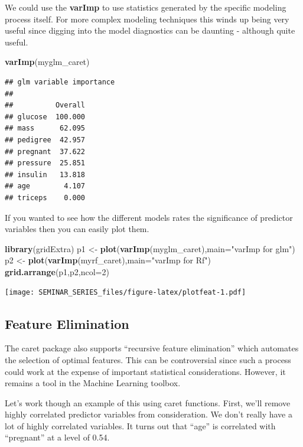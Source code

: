 \documentclass[]{book}
\newenvironment{Shaded}{\begin{snugshade}}{\end{snugshade}}
\newcommand{\KeywordTok}[1]{\textcolor[rgb]{0.13,0.29,0.53}{\textbf{#1}}}
\newcommand{\DataTypeTok}[1]{\textcolor[rgb]{0.13,0.29,0.53}{#1}}
\newcommand{\DecValTok}[1]{\textcolor[rgb]{0.00,0.00,0.81}{#1}}
\newcommand{\StringTok}[1]{\textcolor[rgb]{0.31,0.60,0.02}{#1}}
\newcommand{\NormalTok}[1]{#1}
\begin{document}
We could use the \textbf{varImp} to use statistics generated by the
specific modeling process itself. For more complex modeling techniques
this winds up being very useful since digging into the model diagnostics
can be daunting - although quite useful.

\begin{Shaded}
\begin{Highlighting}[]
\KeywordTok{varImp}\NormalTok{(myglm_caret)}
\end{Highlighting}
\end{Shaded}

\begin{verbatim}
## glm variable importance
## 
##          Overall
## glucose  100.000
## mass      62.095
## pedigree  42.957
## pregnant  37.622
## pressure  25.851
## insulin   13.818
## age        4.107
## triceps    0.000
\end{verbatim}

If you wanted to see how the different models rates the significance of
predictor variables then you can easily plot them.

\begin{Shaded}
\begin{Highlighting}[]
\KeywordTok{library}\NormalTok{(gridExtra)}
\NormalTok{p1 <-}\StringTok{ }\KeywordTok{plot}\NormalTok{(}\KeywordTok{varImp}\NormalTok{(myglm_caret),}\DataTypeTok{main=}\StringTok{"varImp for glm"}\NormalTok{)}
\NormalTok{p2 <-}\StringTok{ }\KeywordTok{plot}\NormalTok{(}\KeywordTok{varImp}\NormalTok{(myrf_caret),}\DataTypeTok{main=}\StringTok{"varImp for Rf"}\NormalTok{)}
\KeywordTok{grid.arrange}\NormalTok{(p1,p2,}\DataTypeTok{ncol=}\DecValTok{2}\NormalTok{)}
\end{Highlighting}
\end{Shaded}

\texttt{[image: SEMINAR\_SERIES\_files/figure-latex/plotfeat-1.pdf]}

\subsection{Feature Elimination}\label{feature-elimination}

The caret package also supports ``recursive feature elimination'' which
automates the selection of optimal features. This can be controversial
since such a process could work at the expense of important statistical
considerations. However, it remains a tool in the Machine Learning
toolbox.

Let's work though an example of this using caret functions. First, we'll
remove highly correlated predictor variables from consideration. We
don't really have a lot of highly correlated variables. It turns out
that ``age'' is correlated with ``pregnant'' at a level of 0.54.
\end{document}

